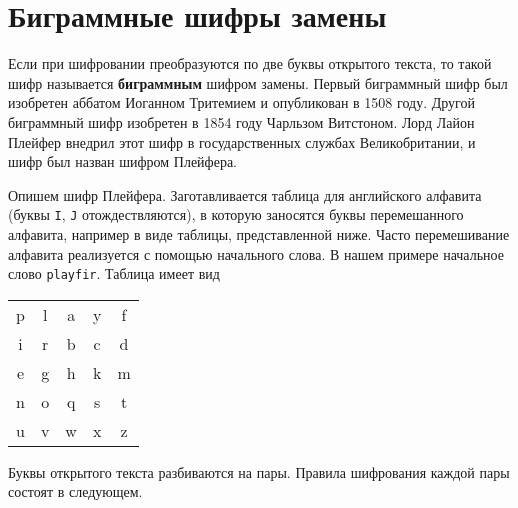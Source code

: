 \section{Биграммные шифры замены}

Если при шифровании преобразуются по две буквы открытого текста, то такой шифр называется \textbf{биграммным} шифром замены. Первый биграммный шифр был изобретен аббатом Иоганном Тритемием и опубликован в 1508 году. Другой биграммный шифр изобретен в 1854 году Чарльзом Витстоном. Лорд Лайон Плейфер внедрил этот шифр в государственных службах Великобритании, и шифр был назван шифром Плейфера.

Опишем шифр Плейфера. Заготавливается таблица для английского алфавита (буквы \texttt{I}, \texttt{J} отождествляются), в которую заносятся буквы перемешанного алфавита, например в виде таблицы, представленной ниже. Часто перемешивание алфавита реализуется с помощью начального слова. В нашем примере начальное слово \texttt{playfir}. Таблица имеет вид

\begin{center}
    \begin{tabular}{ccccc}
        p & l & a & y & f  \\
        i & r & b & c & d  \\
        e & g & h & k & m  \\
        n & o & q & s & t  \\
        u & v & w & x & z  \\
    \end{tabular}
\end{center}

Буквы открытого текста разбиваются на пары. Правила шифрования каждой пары состоят в следующем.

